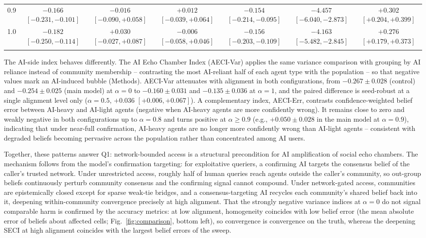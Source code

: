 \documentclass[pdflatex,sn-basic]{sn-jnl}
\begin{document}
\begin{table}[h]
{\begin{tabular}{@{}lcccccc@{}}
0.9 & $\mathbf{-0.166}$ $[-0.231, -0.101]$ & $-0.016$ $[-0.090, +0.058]$ & $+0.012$ $[-0.039, +0.064]$ & $\mathbf{-0.154}$ $[-0.214, -0.095]$ & $\mathbf{-4.457}$ $[-6.040, -2.873]$ & $\mathbf{+0.302}$ $[+0.204, +0.399]$ \\
1.0 & $\mathbf{-0.182}$ $[-0.250, -0.114]$ & $+0.030$ $[-0.027, +0.087]$ & $-0.006$ $[-0.058, +0.046]$ & $\mathbf{-0.156}$ $[-0.203, -0.109]$ & $\mathbf{-4.163}$ $[-5.482, -2.845]$ & $\mathbf{+0.276}$ $[+0.179, +0.373]$ \\
\botrule
\end{tabular}}
\end{table}

The AI-side index behaves differently. The AI Echo Chamber Index (AECI-Var) applies the same variance comparison with grouping by AI reliance instead of community membership -- contrasting the most AI-reliant half of each agent type with the population -- so that negative values mark an AI-induced bubble (Methods). AECI-Var attenuates with alignment in both configurations, from $-0.267 \pm 0.028$ (control) and $-0.254 \pm 0.025$ (main model) at $\alpha = 0$ to $-0.160 \pm 0.031$ and $-0.135 \pm 0.036$ at $\alpha = 1$, and the paired difference is seed-robust at a single alignment level only ($\alpha = 0.5$, $+0.036$ $[+0.006, +0.067]$). A complementary index, AECI-Err, contrasts confidence-weighted belief error between AI-heavy and AI-light agents (negative when AI-heavy agents are more confidently wrong). It remains close to zero and weakly negative in both configurations up to $\alpha = 0.8$ and turns positive at $\alpha \geq 0.9$ (e.g., $+0.050 \pm 0.028$ in the main model at $\alpha = 0.9$), indicating that under near-full confirmation, AI-heavy agents are no longer more confidently wrong than AI-light agents -- consistent with degraded beliefs becoming pervasive across the population rather than concentrated among AI users.

Together, these patterns answer Q1: network-bounded access is a structural precondition for AI amplification of social echo chambers. The mechanism follows from the model's confirmation targeting: for exploitative queriers, a confirming AI targets the consensus belief of the caller's trusted network. Under unrestricted access, roughly half of human queries reach agents outside the caller's community, so out-group beliefs continuously perturb community consensus and the confirming signal cannot compound. Under network-gated access, communities are epistemically closed except for sparse weak-tie bridges, and a consensus-targeting AI recycles each community's shared belief back into it, deepening within-community convergence precisely at high alignment. That the strongly negative variance indices at $\alpha = 0$ do not signal comparable harm is confirmed by the accuracy metrics: at low alignment, homogeneity coincides with low belief error (the mean absolute error of beliefs about affected cells; Fig.~\ref{fig:comparison}, bottom left), so convergence is convergence on the truth, whereas the deepening SECI at high alignment coincides with the largest belief errors of the sweep.
\end{document}
